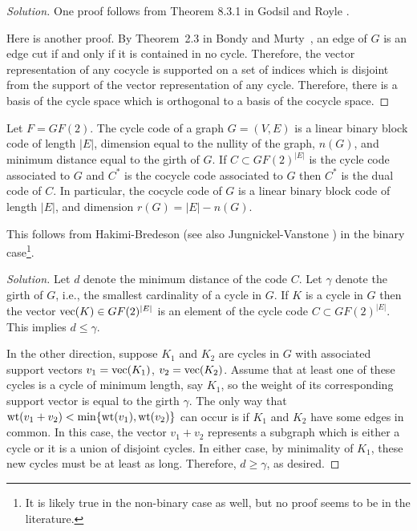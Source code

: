 \begin{proof}[Solution]
One proof follows from Theorem 8.3.1 in Godsil and Royle \cite{GodsilRoyle2004}.

Here is another proof.
By Theorem~2.3 in Bondy and Murty~\cite[p.27]{BondyMurty1976},
an edge of $G$ is an edge cut if and only if it
is contained in no cycle.
Therefore, the vector representation of any
cocycle is supported on a set of indices which is disjoint from the
support of the vector representation of any
cycle. Therefore, there is a basis of the cycle space which is
orthogonal to a basis of the cocycle space.
\end{proof}

\begin{proposition}
{\rm
Let $F=GF(2)$.
The cycle code of a graph $G=(V,E)$ is a linear binary block code of
length $|E|$,  dimension equal to the nullity of the graph, $n(G)$,
and minimum distance equal to the girth of $G$.
If $C\subset GF(2)^{|E|}$ is the cycle code associated to $G$
and $C^*$ is the cocycle code associated to $G$ then
$C^*$ is the dual code of $C$. In particular,
the cocycle code of $G$ is a linear binary block code of length
$|E|$, and dimension $r(G)=|E|-n(G)$.
}
\end{proposition}

This follows from Hakimi-Bredeson \cite{HakimiBredeson1968}
(see also Jungnickel-Vanstone \cite{JungnickelVanstone1997})
in the binary case\footnote{It is likely true
in the non-binary case as well, but no
proof seems to be in the literature.}.

\begin{proof}[Solution]
Let $d$ denote the minimum distance of the code $C$.
Let $\gamma$ denote the girth of $G$,
i.e., the smallest cardinality of a cycle in $G$.
If $K$ is a cycle in $G$ then the
vector ${\rm vec}(K)\in GF(2)^{|E|}$ is an element of the
cycle code $C\subset GF(2)^{|E|}$. This implies $d\leq \gamma$.

In the other direction, suppose $K_1$ and $K_2$ are
cycles in $G$ with associated support vectors
$v_1={\rm vec}(K_1)$, $v_2={\rm vec}(K_2)$.
Assume that at least one of these cycles is a cycle
of minimum length, say $K_1$, so the weight of its corresponding
support vector is equal to the girth $\gamma$.
The only way that
${\rm wt}(v_1+v_2)<\min\{{\rm wt}(v_1),{\rm wt}(v_2)\}$
can occur is if $K_1$ and $K_2$ have some
edges in common. In this case, the vector
$v_1+v_2$ represents a subgraph
which is either a cycle or it is a
union of disjoint cycles. In either case, by
minimality of $K_1$, these new cycles must be at least as
long. Therefore, $d\geq \gamma$, as desired.

\end{proof}

